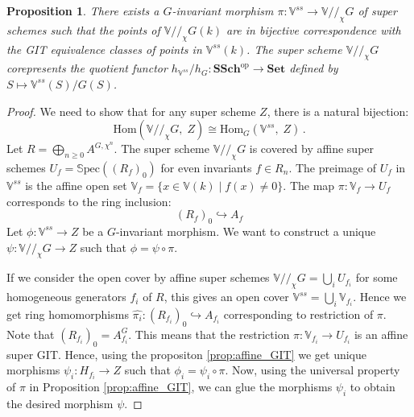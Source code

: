 \documentclass[12pt, reqno]{amsart}
\theoremstyle{plain}
\newtheorem{proposition}[theorem]{Proposition}
\numberwithin{equation}{section}
\newcommand{\Spec}[1]{\mathbb{S}\mathrm{pec}(#1)}
\newcommand{\SSch}{\mathbf{SSch}}
\newcommand{\Set}{\mathbf{Set}}
\begin{document}
\begin{proposition}\label{prop-git-co-rep}
There exists a $G$-invariant morphism $\pi: \mathbb{V}^{ss} \to \mathbb{V} / \! \!/_{\! \!\chi} G$ of super schemes such that the points of $\mathbb{V} / \!\! /_{\! \!\chi} G (k)$ are in bijective correspondence with the GIT equivalence classes of points in $\mathbb{V}^{ss}(k)$. 
The super scheme $\mathbb{V} / \!\! /_{\! \!\chi} G$ corepresents the quotient functor $h_{\mathbb{V}^{ss}}/ h_G: \mathsf{\SSch}^\text{op} \to \Set$ defined by $S \mapsto \mathbb{V}^{ss}(S) / G(S)$.
\end{proposition}
\begin{proof}
We need to show that for any super scheme $Z$, there is a natural bijection:
\[ 
\text{Hom}(\mathbb{V} / \!\! /_{\! \!\chi} G, \;Z) \cong \text{Hom}_G(\mathbb{V}^{ss}, \;Z) \,.
\]
Let $R = \bigoplus_{n\geq 0} A^{G, \chi^n}$. The super scheme $\mathbb{V} / \!\! /_{\! \!\chi} G$ is covered by affine super schemes $U_f = \Spec{(R_f)_0}$ for even invariants $f \in R_n$. The preimage of $U_f$ in $\mathbb{V}^{ss}$ is the affine open set $\mathbb{V}_f = \{x \in \mathbb{V}(k) \mid f(x) \neq 0\}$. The map $\pi: \mathbb{V}_f \rightarrow U_f$ corresponds to the ring inclusion:
\[ 
(R_f)_0 \hookrightarrow A_f 
\]
Let $\phi \colon \mathbb{V}^{ss} \rightarrow Z$ be a $G$-invariant morphism.
We want to construct a unique $\psi \colon \mathbb{V} / \!\! /_{\! \!\chi} G \to Z$ such that $\phi = \psi \circ \pi$.

If we consider the open cover by affine super schemes $\mathbb{V} / \!\! /_{\! \!\chi} G = \bigcup_i U_{f_i}$ for some homogeneous generators $f_i$ of $R$, this gives an open cover $\mathbb{V}^{ss} = \bigcup_i \mathbb{V}_{f_i}$. Hence we get ring homomorphisms $\hat{\pi_i}: (R_{f_i})_0 \hookrightarrow A_{f_{i}}$ corresponding to restriction of $\pi$. Note that $(R_{f_i})_0 = A_{f_i}^G$.
This means that the restriction $\pi: \mathbb{V}_{f_i} \to U_{f_i}$ is an affine super GIT. Hence, using the propositon \ref{prop:affine_GIT} we get unique morphisms $\psi_i: H_{f_i} \to Z$ such that $\phi_i = \psi_i \circ \pi$. Now, using the universal property of $\pi$ in Proposition \ref{prop:affine_GIT}, we can glue the morphisms $\psi_i$ to obtain the desired morphism $\psi$. 
\end{proof}
\end{document}
